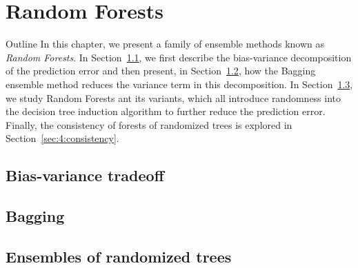 \chapter{Random Forests}\label{ch:forest}

\begin{remark}{Outline}
In this chapter, we present a family of ensemble methods known as
\textit{Random Forests}. In Section~\ref{sec:4:bias-variance}, we first
describe the bias-variance decomposition of the prediction error and then
present, in Section~\ref{sec:4:bagging}, how the Bagging ensemble method
reduces the variance term in this decomposition. In
Section~\ref{sec:4:ensemble}, we study Random Forests ant its variants, which
all introduce randomness into the decision tree induction algorithm
to further reduce the prediction error. Finally, the consistency of forests of
randomized trees is explored in Section~\ref{sec:4:consistency}.
\end{remark}

\section{Bias-variance tradeoff}
\label{sec:4:bias-variance}


\section{Bagging}
\label{sec:4:bagging}




\section{Ensembles of randomized trees}
\label{sec:4:ensemble}


